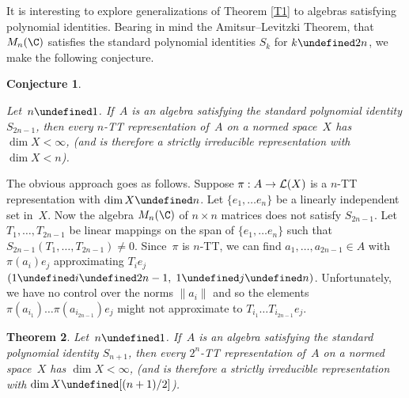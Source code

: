 \documentclass[11pt]{article}
\let\leq\undefined  \let\geq\undefined
\let\le\leq   \let\ge\geq
\newtheorem{thm}{Theorem}[section]
\newtheorem{conject}[thm]{Conjecture}
\newenvironment{Conjecture}{\begin{conject}\begin{rm}}{\end{rm}\end{conject}}
\newcommand{\LX}{{\cal L}(X)}
\begin{document}
It is interesting to explore generalizations of Theorem \ref{T1} to algebras
satisfying polynomial identities.  Bearing in mind the Amitsur--Levitzki
Theorem, that $M_n(\C)$ satisfies the standard polynomial identities $S_k$ for
$k \ge 2n$, we make the following conjecture.

\begin{Conjecture}
Let~$n \ge 1$. If~$A$ is an algebra satisfying the standard polynomial identity
$S_{2n-1}$, then every $n$-TT representation of~$A$ on a
normed space~$X$ has $\dim X < \infty$, (and is therefore a strictly irreducible
representation with $\dim X < n$).
\end{Conjecture}

The obvious approach goes as follows.  Suppose $\pi:A \to \LX$ is a
$n$-TT representation with $\dim X \ge n$.  Let
$\{e_1,\dots e_n\}$ be a linearly independent set in~$X$.   Now the algebra
$M_n(\C)$ of $n \times n$ matrices does not satisfy $S_{2n-1}$.   Let
$T_1,\dots,T_{2n-1}$ be linear mappings  on the span of $\{e_1,\dots e_n\}$ such
that $S_{2n-1}(T_1,\dots,T_{2n-1}) \ne 0$.   Since~$\pi$ is $n$-TT, we
can find $a_1,\dots,a_{2n-1} \in A$ with $\pi(a_i)e_j$ approximating $T_ie_j$
$(1 \le i \le 2n-1,\;1 \le j \le n)$.    Unfortunately, we have no control over
the norms $\|a_i\|$ and so the elements $\pi(a_{i_1})\dots\pi(a_{i_{2n-1}})e_j$
might not approximate to $T_{i_1}\dots T_{i_{2n-1}}e_j$.

\begin{thm}\label{T1.5}
Let~$n \ge 1$. If~$A$ is an algebra satisfying the standard polynomial
identity $S_{n+1}$, then every $2^n$-TT representation
of~$A$ on a normed space~$X$ has $\dim X < \infty$, (and is therefore a strictly
irreducible representation with $\dim X \le [(n+1)/2]$).
\end{thm}
\end{document}

